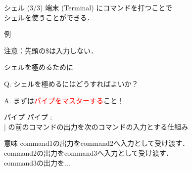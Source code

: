 \documentclass[uplatex, dvipdfmx, 12pt]{beamer}
\begin{document}
\begin{frame}{シェル (3/3)}
  端末 (Terminal) にコマンドを打つことで\\
  シェルを使うことができる．

  \vspace{1em}
  例
  \begin{tcolorbox}
  \lstShell
  \end{tcolorbox}
  注意：先頭の\$は入力しない．
\end{frame}

\begin{frame}{シェルを極めるために}
  \begin{large}
  Q. シェルを極めるにはどうすればよいか？
  
  \pause
    \vspace{2em}
  A. まずは\textcolor{red}{パイプをマスターする}こと！
  \end{large}
\end{frame}

\begin{frame}{パイプ}
  パイプ :  \\
  $|$ の前のコマンドの出力を次のコマンドの入力とする仕組み 


  \vspace{1em}
  \begin{tcolorbox}
  \lstpipe
  \end{tcolorbox}

  \begin{block}{意味}
    command1の出力をcommand2へ入力として受け渡す．\\
    command2の出力をcommand3へ入力として受け渡す．\\
    command3の出力を...
  \end{block}
\end{frame}

\end{document}

